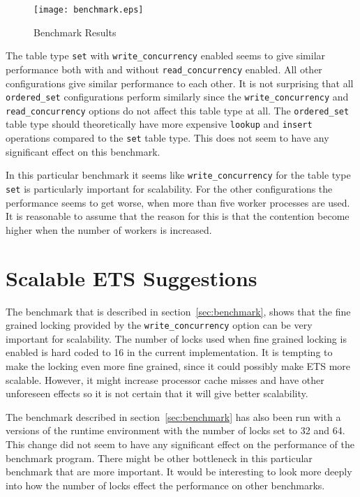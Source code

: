 \documentclass[aps,pre,preprint,nofootinbib]{revtex4}
\begin{document}
  
\begin{figure}[htb]
\centering
\texttt{[image: benchmark.eps]}
\caption{Benchmark Results} 
\label{fig:benchmark_results}
\end{figure}

  The table type \verb|set| with \verb|write_concurrency| enabled seems to give similar performance both with and without \verb|read_concurrency| enabled.
  All other configurations give similar performance to each other.
  It is not surprising that all \verb|ordered_set| configurations perform similarly since the \verb|write_concurrency| and \verb|read_concurrency| options do not affect this table type at all.
  The \verb|ordered_set| table type should theoretically have more expensive \verb|lookup| and \verb|insert| operations compared to the \verb|set| table type.
  This does not seem to have any significant effect on this benchmark.
  
  In this particular benchmark it seems like \verb|write_concurrency| for the table type \verb|set| is particularly important for scalability.
  For the other configurations the performance seems to get worse, when more than five worker processes are used.
  It is reasonable to assume that the reason for this is that the contention become higher when the number of workers is increased.

  
  
\section{Scalable ETS Suggestions}

  The benchmark that is described in section~\ref{sec:benchmark}, shows that the fine grained locking provided by the \verb|write_concurrency| option can be very important for scalability.
  The number of locks used when fine grained locking is enabled is hard coded to 16 in the current implementation.
  It is tempting to make the locking even more fine grained, since it could possibly make ETS more scalable.
  However, it might increase processor cache misses and have other unforeseen effects so it is not certain that it will give better scalability. 
  
  The benchmark described in section~\ref{sec:benchmark} has also been run with a versions of the runtime environment with the number of locks set to 32 and 64.
  This change did not seem to have any significant effect on the performance of the benchmark program.
  There might be other bottleneck in this particular benchmark that are more important.
  It would be interesting to look more deeply into how the number of locks effect the performance on other benchmarks.
  
\end{document}
